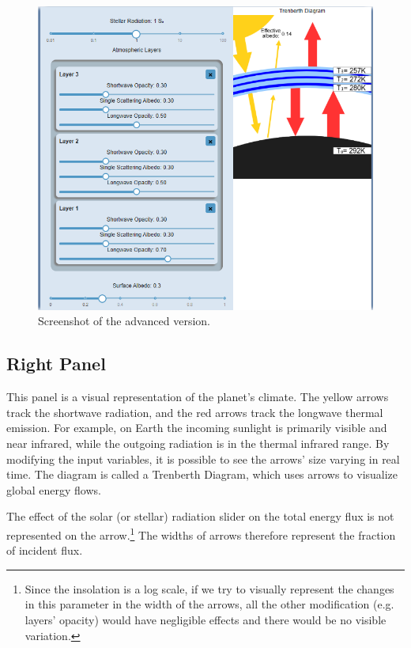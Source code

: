 \documentclass[a4paper,12pt]{article}
\begin{document}
\begin{figure}[H]
    \centering
    \includegraphics[width=\textwidth]{Pro.PNG}
    \caption{Screenshot of the advanced version.}
    \label{fig:pro}
\end{figure}


\subsection*{Right Panel}

This panel is a visual representation of the planet's climate. The yellow arrows track the shortwave radiation, and the red arrows track the longwave thermal emission. For example, on Earth the incoming sunlight is primarily visible and near infrared, while the outgoing radiation is in the thermal infrared range. By modifying the input variables, it is possible to see the arrows' size varying in real time. The diagram is called a Trenberth Diagram, which uses arrows to visualize global energy flows.

The effect of the solar (or stellar) radiation slider on the total energy flux is not represented on the arrow.\footnote{Since the insolation is a log scale, if we try to visually represent the changes in this parameter in the width of the arrows, all the other modification (e.g. layers' opacity) would have negligible effects and there would be no visible variation.} The widths of arrows therefore represent the fraction of incident flux.
\end{document}
